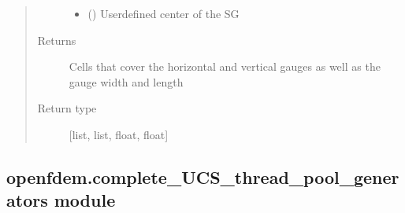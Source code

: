 \documentclass[letterpaper,10pt,english]{sphinxmanual}
\begin{document}
\begin{fulllineitems}
\begin{quote}
\begin{description}
\begin{itemize}
\item {} 
 (\sphinxstyleliteralemphasis{\sphinxupquote{{[}}}\sphinxstyleliteralemphasis{\sphinxupquote{, }}\sphinxstyleliteralemphasis{\sphinxupquote{, }}\sphinxstyleliteralemphasis{\sphinxupquote{{]}}}) \textendash{} User\sphinxhyphen{}defined center of the SG

\end{itemize}

\item[{Returns}] \leavevmode
Cells that cover the horizontal and vertical gauges as well as the gauge width and length

\item[{Return type}] \leavevmode
{[}list, list, float, float{]}

\end{description}\end{quote}

\end{fulllineitems}



\subsection{openfdem.complete\_UCS\_thread\_pool\_generators module}
\label{\detokenize{openfdem:module-openfdem.complete_UCS_thread_pool_generators}}\label{\detokenize{openfdem:openfdem-complete-ucs-thread-pool-generators-module}}

\begin{fulllineitems}
\label{\detokenize{openfdem:openfdem.complete_UCS_thread_pool_generators.check_loading_direction}}
\end{fulllineitems}
\end{document}
